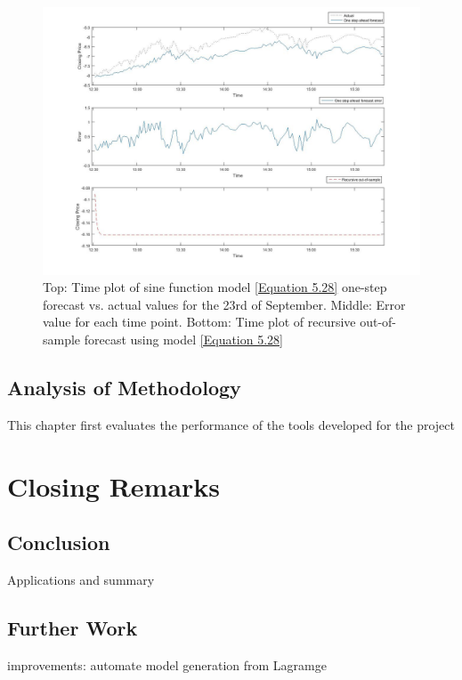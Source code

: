 \documentclass[13pt]{report}
\begin{document}
\begin{figure}[H]
\centering
\label{VWNonlinear23fig}
\includegraphics[width=\textwidth]{23nonlinear}
\caption{Top: Time plot of sine function model \ref{Equation 5.28} one-step forecast vs. actual values for the 23rd of September. Middle: Error value for each time point. Bottom: Time plot of recursive out-of-sample forecast using model \ref{Equation 5.28}}
\end{figure}

\section{Analysis of Methodology}
This chapter first evaluates the performance of the tools developed for the project
\chapter{Closing Remarks}
\section{Conclusion}
Applications and summary
\section{Further Work}

improvements: automate model generation from  Lagramge



{}

\end{document}
